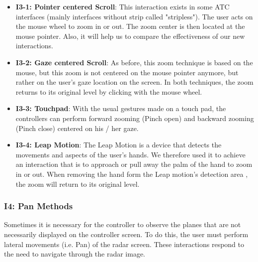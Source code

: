 \begin{itemize}

\item  \textbf{I3-1: Pointer centered Scroll}: This interaction exists in some ATC interfaces (mainly interfaces without strip called "stripless"). The user acts on
the mouse wheel to zoom in or out. The zoom center is then
located at the mouse pointer. Also, it will help us to compare
the effectiveness of our new interactions.

\item \textbf{I3-2: Gaze centered Scroll}: As before, this zoom technique is based on the mouse, but
this zoom is not centered on the mouse pointer anymore, but
rather on the user's gaze location on the screen. In both
techniques, the zoom returns to its original level by clicking
with the mouse wheel.

\item \textbf{I3-3: Touchpad}: With the usual gestures made on a touch pad, the controllers can perform forward zooming (Pinch open) and backward
zooming (Pinch close) centered on his / her gaze.

\item \textbf{I3-4: Leap Motion}: The Leap Motion is a device that detects the movements and
aspects of the user's hands. We therefore used it to achieve
an interaction that is to approach or pull away the palm of
the hand to zoom in or out. When removing the hand form
the Leap motion's detection area , the zoom will return to
its original level.


\end{itemize}




\subsubsection{I4: Pan Methods}
Sometimes it is necessary for the controller to observe the
planes that are not necessarily displayed on the controller
screen. To do this, the user must perform lateral movements
(i.e. Pan) of the radar screen. These interactions respond to
the need to navigate through the radar image.

